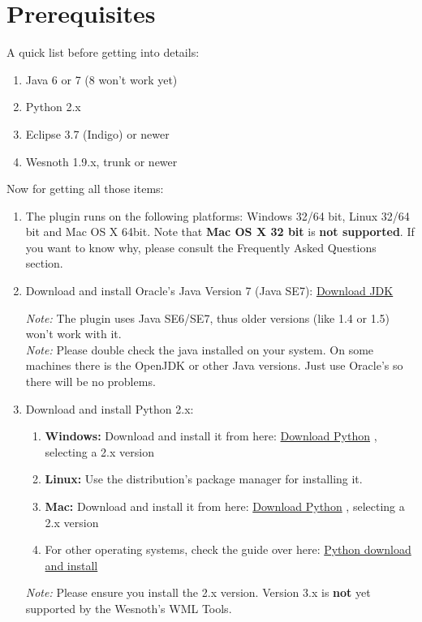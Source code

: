 \documentclass[10pt]{article}
\begin{document}
\section{Prerequisites}
A quick list before getting into details:
\begin{enumerate}
\item Java 6 or 7 (8 won't work yet)
\item Python 2.x
\item Eclipse 3.7 (Indigo) or newer
\item Wesnoth 1.9.x, trunk or newer
\end{enumerate}

Now for getting all those items:
\begin{enumerate}
\item The plugin runs on the following platforms: Windows 32/64 bit, Linux 32/64 bit and Mac OS X 64bit. Note that \textbf{Mac OS X 32 bit} is \textbf{not supported}. If you want to know why, please consult the Frequently Asked Questions section.
\item Download and install Oracle's Java Version 7 (Java SE7): \href{http://www.oracle.com/technetwork/java/javase/downloads/jdk7-downloads-1880260.html}{Download JDK}

\textit{Note:} The plugin uses Java SE6/SE7, thus older versions (like 1.4 or 1.5) won't work with it.\\
\textit{Note:} Please double check the java installed on your system. On some machines there is the OpenJDK or other Java versions. Just use Oracle's so there will be no problems.

\item Download and install Python 2.x:
 \begin{enumerate}
   \item \textbf{Windows:} Download and install it from here: \href{http://python.org/download/}{Download Python} , selecting a 2.x version
   \item \textbf{Linux:} Use the distribution's package manager for installing it.
   \item \textbf{Mac:} Download and install it from here: \href{http://python.org/download/}{Download Python} , selecting a 2.x version
   \item For other operating systems, check the guide over here: \href{http://wiki.python.org/moin/BeginnersGuide/Download}{Python download and install}
  \end{enumerate}
 \textit{Note:} Please ensure you install the 2.x version. Version 3.x is \textbf{not} yet supported by the Wesnoth's WML Tools.


\end{enumerate}
\end{document}
